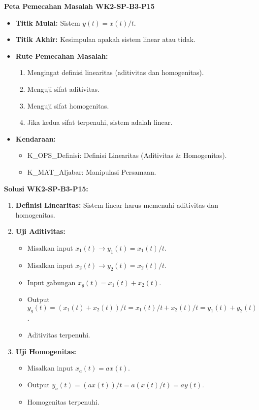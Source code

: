 \documentclass[
  letterpaper,
  DIV=11,
  numbers=noendperiod]{scrreprt}
\providecommand{\tightlist}{%
  \setlength{\itemsep}{0pt}\setlength{\parskip}{0pt}}
\begin{document}
\textbf{Peta Pemecahan Masalah WK2-SP-B3-P15}

\begin{itemize}
\tightlist
\item
  \textbf{Titik Mulai:} Sistem \(y(t) = x(t)/t\).
\item
  \textbf{Titik Akhir:} Kesimpulan apakah sistem linear atau tidak.
\item
  \textbf{Rute Pemecahan Masalah:}

  \begin{enumerate}
  \def\labelenumi{\arabic{enumi}.}
  \tightlist
  \item
    Mengingat definisi linearitas (aditivitas dan homogenitas).
  \item
    Menguji sifat aditivitas.
  \item
    Menguji sifat homogenitas.
  \item
    Jika kedua sifat terpenuhi, sistem adalah linear.
  \end{enumerate}
\item
  \textbf{Kendaraan:}

  \begin{itemize}
  \tightlist
  \item
    K\_OPS\_Definisi: Definisi Linearitas (Aditivitas \& Homogenitas).
  \item
    K\_MAT\_Aljabar: Manipulasi Persamaan.
  \end{itemize}
\end{itemize}

\textbf{Solusi WK2-SP-B3-P15:}

\begin{enumerate}
\def\labelenumi{\arabic{enumi}.}
\tightlist
\item
  \textbf{Definisi Linearitas:} Sistem linear harus memenuhi aditivitas
  dan homogenitas.
\item
  \textbf{Uji Aditivitas:}

  \begin{itemize}
  \tightlist
  \item
    Misalkan input \(x_1(t) \rightarrow y_1(t) = x_1(t)/t\).
  \item
    Misalkan input \(x_2(t) \rightarrow y_2(t) = x_2(t)/t\).
  \item
    Input gabungan \(x_g(t) = x_1(t) + x_2(t)\).
  \item
    Output
    \(y_g(t) = (x_1(t) + x_2(t))/t = x_1(t)/t + x_2(t)/t = y_1(t) + y_2(t)\).
  \item
    Aditivitas terpenuhi.
  \end{itemize}
\item
  \textbf{Uji Homogenitas:}

  \begin{itemize}
  \tightlist
  \item
    Misalkan input \(x_a(t) = a x(t)\).
  \item
    Output \(y_a(t) = (a x(t))/t = a (x(t)/t) = a y(t)\).
  \item
    Homogenitas terpenuhi.
  \end{itemize}
\end{enumerate}
\end{document}
